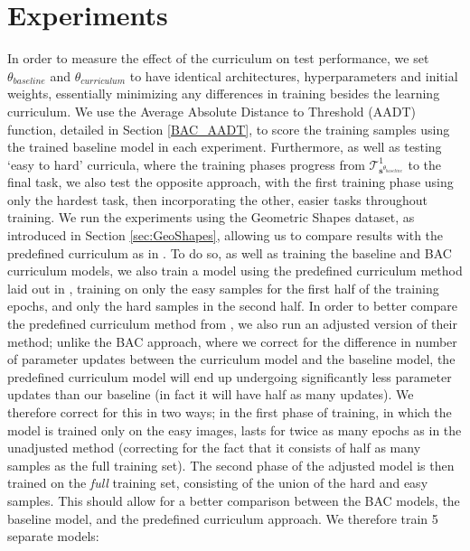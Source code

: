 \section{Experiments}
 In order to measure the effect of the curriculum on test performance, we set $\theta_{baseline}$ and $\theta_{curriculum}$ to have identical architectures, hyperparameters and initial weights, essentially minimizing any differences in training besides the learning curriculum. We use the Average Absolute Distance to Threshold (AADT) function, detailed in Section \ref{BAC_AADT}, to score the training samples using the trained baseline model in each experiment. Furthermore, as well as testing `easy to hard' curricula, where the training phases progress from  $\mathcal{T}^1_{\mathbf{s}^{\theta_{baseline}}}$ to the final task, we also test the opposite approach, with the first training phase using only the hardest task, then incorporating the other, easier tasks throughout training. We run the experiments using the Geometric Shapes dataset, as introduced in Section \ref{sec:GeoShapes}, allowing us to compare results with the predefined curriculum as in \cite{Bengio2009}. To do so, as well as training the baseline and BAC curriculum models, we also train a model using the predefined curriculum method laid out in \cite{Bengio2009}, training on only the easy samples for the first half of the training epochs, and only the hard samples in the second half. In order to better compare the predefined curriculum method from \cite{Bengio2009}, we also run an adjusted version of their method; unlike the BAC approach, where we correct for the difference in number of parameter updates between the curriculum model and the baseline model, the predefined curriculum model will end up undergoing significantly less parameter updates than our baseline (in fact it will have half as many updates). We therefore correct for this in two ways; in the first phase of training, in which the model is trained only on the easy images, lasts for twice as many epochs as in the unadjusted method (correcting for the fact that it consists of half as many samples as the full training set). The second phase of the adjusted model is then trained on the \textit{full} training set, consisting of the union of the hard and easy samples. This should allow for a better comparison between the BAC models, the baseline model, and the predefined curriculum approach. We therefore train 5 separate models:

